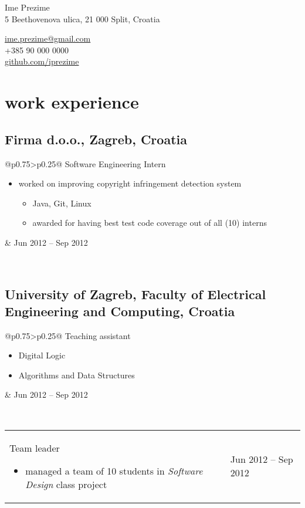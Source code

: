 \documentclass[a4paper]{article}
\makeatletter
\newlength{\tablewidth}
\newenvironment{period}[2]{%
\newcommand{\sarma}{#2}%
\setlength{\tablewidth}{\linewidth}
\addtolength{\tablewidth}{-2\tabcolsep}
\begin{tabular}{@{}p{0.75\tablewidth}>{\raggedleft\arraybackslash}p{0.25\tablewidth}@{}}%
#1 \newline
\begin{itemize}
}{%
\end{itemize} & \sarma \\%
\end{tabular}\\
}
\makeatother
\begin{document}
\fontfamily{\sfdefault}
\selectfont

\begin{minipage}{.5\textwidth}
\LARGE{Ime Prezime}\\
\normalsize{5 Beethovenova ulica, 21 000 Split, Croatia}
\end{minipage}%
\begin{minipage}{.5\textwidth}
\raggedleft
\href{mailto:ime.prezime@gmail.com}{ime.prezime@gmail.com} \\
+385 90 000 0000 \\
\href{https://github.com/iprezime}{github.com/iprezime}
\end{minipage}

\vspace{1em}

\section{work experience}
\subsection{Firma d.o.o., Zagreb, Croatia}
\begin{period}{Software Engineering Intern}{Jun 2012 -- Sep 2012}
    \item 
        worked on improving copyright infringement detection system
        \begin{itemize}
            \item Java, Git, Linux
            \item awarded for having best test code coverage out of all (10) interns
        \end{itemize}
\end{period}
\subsection{University of Zagreb, Faculty of Electrical Engineering and Computing, Croatia}
\begin{period}{Teaching assistant}{Oct 2008 -- May 2009}
    \item Digital Logic
    \item Algorithms and Data Structures
\end{period}
\begin{period}{Team leader}{Sep 2011 -- Jan 2012}
    \item managed a team of 10 students in \textit{Software Design} class project
\end{period}
\end{document}
